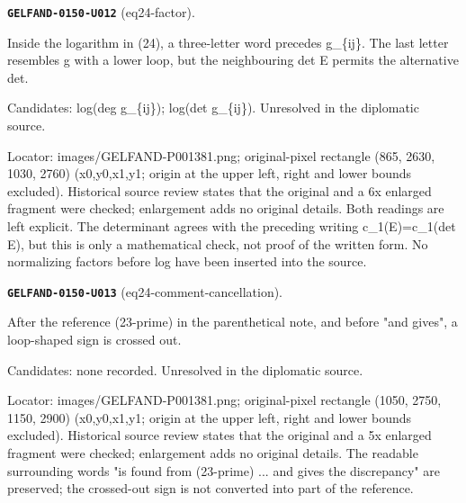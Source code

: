 \documentclass[11pt]{article}
\theoremstyle{definition}
\theoremstyle{remark}
\begin{document}
\noindent\leavevmode{}\label{GELFAND-P001381:eq24-factor:note}\textbf{\texttt{GELFAND-0150-U012}} (eq24-factor).\par\nopagebreak[4]
Inside the logarithm in (24), a three-letter word precedes g\_\{ij\}. The last letter resembles g with a lower loop, but the neighbouring det E permits the alternative det.\par
Candidates: log(deg g\_\{ij\}); log(det g\_\{ij\}). Unresolved in the diplomatic source.\par
Locator: images/GELFAND-P001381.png; original-pixel rectangle (865, 2630, 1030, 2760) (x0,y0,x1,y1; origin at the upper left, right and lower bounds excluded). Historical source review states that the original and a 6x enlarged fragment were checked; enlargement adds no original details. Both readings are left explicit. The determinant agrees with the preceding writing c\_1(E)=c\_1(det E), but this is only a mathematical check, not proof of the written form. No normalizing factors before log have been inserted into the source.\par\medskip
\noindent\leavevmode{}\label{GELFAND-P001381:eq24-comment-cancellation:note}\textbf{\texttt{GELFAND-0150-U013}} (eq24-comment-cancellation).\par\nopagebreak[4]
After the reference (23-prime) in the parenthetical note, and before "and gives", a loop-shaped sign is crossed out.\par
Candidates: none recorded. Unresolved in the diplomatic source.\par
Locator: images/GELFAND-P001381.png; original-pixel rectangle (1050, 2750, 1150, 2900) (x0,y0,x1,y1; origin at the upper left, right and lower bounds excluded). Historical source review states that the original and a 5x enlarged fragment were checked; enlargement adds no original details. The readable surrounding words "is found from (23-prime) ... and gives the discrepancy" are preserved; the crossed-out sign is not converted into part of the reference.\par\medskip
\end{document}
